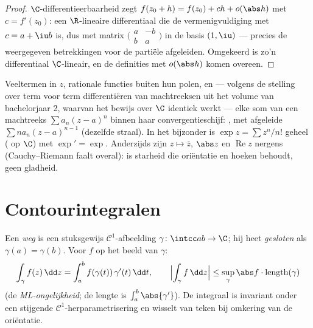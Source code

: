 \begin{proof}
$\C$-differentieerbaarheid zegt $f(z_0 + h) = f(z_0) + ch +
o(\abs h)$ met $c = f'(z_0)$: een $\R$-lineaire differentiaal die
de vermenigvuldiging met $c = a + \iu b$ is, dus met matrix
$\bigl(\begin{smallmatrix} a & -b\\ b & a
\end{smallmatrix}\bigr)$ in de basis $(1, \iu)$ --- precies de
weergegeven betrekkingen voor de partiële afgeleiden. Omgekeerd
is zo'n differentiaal $\C$-lineair, en de definities met $o(\abs
h)$ komen overeen.
\end{proof}

\begin{example}\label{ex:b3:holomorphic:examples}
Veeltermen in $z$, rationale functies buiten hun polen, en ---
volgens de stelling over term voor term differentiëren van
machtreeksen uit het volume van bachelorjaar 2, waarvan het
bewijs over $\C$ identiek werkt --- elke som van een machtreeks
$\sum a_n(z - a)^n$ binnen haar convergentieschijf: , met
afgeleide $\sum na_n(z - a)^{n-1}$ (dezelfde straal). In het
bijzonder is $\exp z = \sum z^n/n!$ geheel ( op $\C$) met
$\exp' = \exp$. Anderzijds zijn $z \mapsto \bar z$, $\abs z$ en
$\operatorname{Re}z$ nergens  (Cauchy--Riemann faalt
overal):  is starheid die oriëntatie en hoeken behoudt,
geen gladheid.
\end{example}

\section{Contourintegralen}

\begin{definition}\label{def:b3:holomorphic:contour}
Een \emph{weg} is een stuksgewijs $\mathcal C^1$-afbeelding
$\gamma \colon \intcc ab \to \C$; hij heet \emph{gesloten} als
$\gamma(a) = \gamma(b)$. Voor  $f$ op het beeld van
$\gamma$:
\[
\int_\gamma f(z)\,\dd z =
\int_a^b f(\gamma(t))\,\gamma'(t)\,\dd t,
\qquad
\Bigl|\int_\gamma f\,\dd z\Bigr| \leq
\sup_{\gamma}\abs f\cdot\operatorname{length}(\gamma)
\]
(de \emph{ML-ongelijkheid}; de lengte is $\int_a^b
\abs{\gamma'}$). De integraal is invariant onder een stijgende
$\mathcal C^1$-herparametrisering en wisselt van teken bij
omkering van de oriëntatie.
\end{definition}

